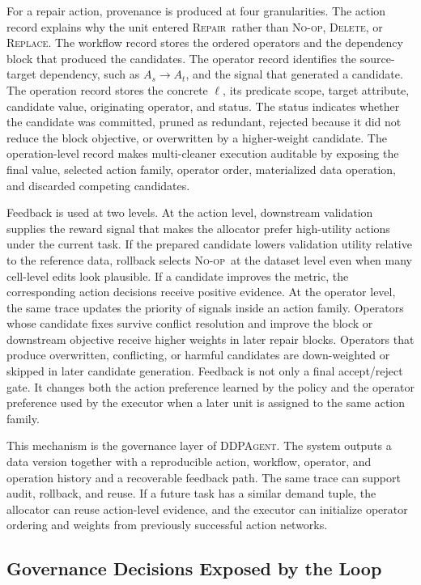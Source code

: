 \documentclass[sigconf, nonacm]{acmart}
\newcommand{\sys}{\textsc{DDPAgent}\xspace}
\newcommand{\noop}{\textsc{No-op}\xspace}
\newcommand{\repair}{\textsc{Repair}\xspace}
\newcommand{\deleteop}{\textsc{Delete}\xspace}
\newcommand{\replaceop}{\textsc{Replace}\xspace}
\begin{document}
For a repair action, provenance is produced at four granularities. The action record explains why the unit entered \repair\ rather than \noop, \deleteop, or \replaceop. The workflow record stores the ordered operators and the dependency block that produced the candidates. The operator record identifies the source-target dependency, such as $A_s\rightarrow A_t$, and the signal that generated a candidate. The operation record stores the concrete $\ell$, its predicate scope, target attribute, candidate value, originating operator, and status. The status indicates whether the candidate was committed, pruned as redundant, rejected because it did not reduce the block objective, or overwritten by a higher-weight candidate. The operation-level record makes multi-cleaner execution auditable by exposing the final value, selected action family, operator order, materialized data operation, and discarded competing candidates.

Feedback is used at two levels. At the action level, downstream validation supplies the reward signal that makes the allocator prefer high-utility actions under the current task. If the prepared candidate lowers validation utility relative to the reference data, rollback selects \noop\ at the dataset level even when many cell-level edits look plausible. If a candidate improves the metric, the corresponding action decisions receive positive evidence. At the operator level, the same trace updates the priority of signals inside an action family. Operators whose candidate fixes survive conflict resolution and improve the block or downstream objective receive higher weights in later repair blocks. Operators that produce overwritten, conflicting, or harmful candidates are down-weighted or skipped in later candidate generation. Feedback is not only a final accept/reject gate. It changes both the action preference learned by the policy and the operator preference used by the executor when a later unit is assigned to the same action family.

This mechanism is the governance layer of \sys. The system outputs a data version together with a reproducible action, workflow, operator, and operation history and a recoverable feedback path. The same trace can support audit, rollback, and reuse. If a future task has a similar demand tuple, the allocator can reuse action-level evidence, and the executor can initialize operator ordering and weights from previously successful action networks.

\subsection{Governance Decisions Exposed by the Loop}
\end{document}
